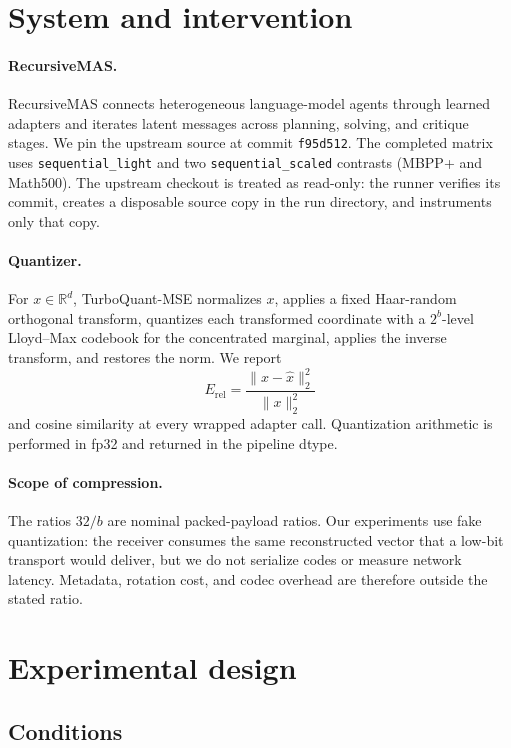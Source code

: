 \documentclass{article}
\newcommand{\method}{TurboQuant-MSE\xspace}
\newcommand{\erel}{E_{\mathrm{rel}}}
\begin{document}
\section{System and intervention}

\paragraph{RecursiveMAS.}
RecursiveMAS connects heterogeneous language-model agents through learned adapters
and iterates latent messages across planning, solving, and critique stages. We pin
the upstream source at commit \texttt{f95d512}. The completed matrix uses
\texttt{sequential\_light} and two \texttt{sequential\_scaled} contrasts (MBPP+ and Math500).
The upstream checkout is treated as read-only: the runner verifies its commit,
creates a disposable source copy in the run directory, and instruments only that
copy.

\paragraph{Quantizer.}
For $x\in\mathbb{R}^d$, \method normalizes $x$, applies a fixed Haar-random
orthogonal transform, quantizes each transformed coordinate with a $2^b$-level
Lloyd--Max codebook for the concentrated marginal, applies the inverse transform,
and restores the norm. We report
\[
\erel = \frac{\lVert x-\hat{x}\rVert_2^2}{\lVert x\rVert_2^2}
\]
and cosine similarity at every wrapped adapter call. Quantization arithmetic is
performed in fp32 and returned in the pipeline dtype.

\paragraph{Scope of compression.}
The ratios $32/b$ are nominal packed-payload ratios. Our experiments use fake
quantization: the receiver consumes the same reconstructed vector that a low-bit
transport would deliver, but we do not serialize codes or measure network latency.
Metadata, rotation cost, and codec overhead are therefore outside the stated ratio.

\section{Experimental design}

\subsection{Conditions}
\end{document}
